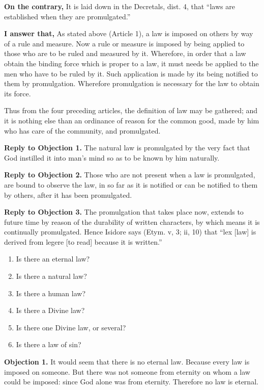 \textbf{On the contrary,} It is laid down in the Decretals, dist. 4, that ``laws are established when they are promulgated.''

\textbf{I answer that,} As stated above (Article 1), a law is imposed on others by way of a rule and measure. Now a rule or measure is imposed by being applied to those who are to be ruled and measured by it. Wherefore, in order that a law obtain the binding force which is proper to a law, it must needs be applied to the men who have to be ruled by it. Such application is made by its being notified to them by promulgation. Wherefore promulgation is necessary for the law to obtain its force.

Thus from the four preceding articles, the definition of law may be gathered; and it is nothing else than an ordinance of reason for the common good, made by him who has care of the community, and promulgated.

\textbf{Reply to Objection 1.} The natural law is promulgated by the very fact that God instilled it into man's mind so as to be known by him naturally.

\textbf{Reply to Objection 2.} Those who are not present when a law is promulgated, are bound to observe the law, in so far as it is notified or can be notified to them by others, after it has been promulgated.

\textbf{Reply to Objection 3.} The promulgation that takes place now, extends to future time by reason of the durability of written characters, by which means it is continually promulgated. Hence Isidore says (Etym. v, 3; ii, 10) that ``lex [law] is derived from legere [to read] because it is written.''


\begin{enumerate}

\item  Is there an eternal law? 
\item  Is there a natural law? 
\item  Is there a human law? 
\item  Is there a Divine law? 
\item  Is there one Divine law, or several? 
\item  Is there a law of sin? 
\end{enumerate}


\textbf{Objection 1.} It would seem that there is no eternal law. Because every law is imposed on someone. But there was not someone from eternity on whom a law could be imposed: since God alone was from eternity. Therefore no law is eternal.

